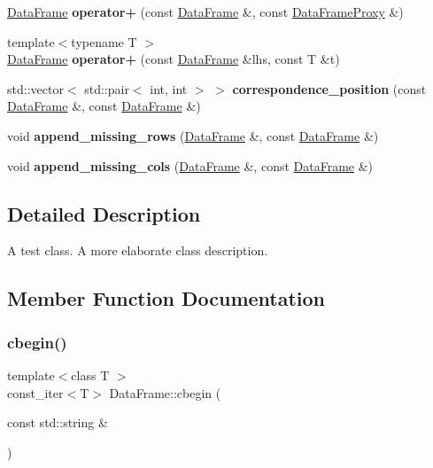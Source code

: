 \begin{DoxyCompactItemize}
\item 
\mbox{\label{classDataFrame_a32fc0676af70bd35bf83e11c9ab946fc}} 
\hyperlink{classDataFrame}{Data\+Frame} {\bfseries operator+} (const \hyperlink{classDataFrame}{Data\+Frame} \&, const \hyperlink{classDataFrame_1_1DataFrameProxy}{Data\+Frame\+Proxy} \&)
\item 
\mbox{\label{classDataFrame_af0bd28935e605ba646d407b02e0a5850}} 
{\footnotesize template$<$typename T $>$ }\\\hyperlink{classDataFrame}{Data\+Frame} {\bfseries operator+} (const \hyperlink{classDataFrame}{Data\+Frame} \&lhs, const T \&t)
\item 
\mbox{\label{classDataFrame_a425d7127fe7def6529cd4e6a6c1ec11f}} 
std\+::vector$<$ std\+::pair$<$ int, int $>$ $>$ {\bfseries correspondence\+\_\+position} (const \hyperlink{classDataFrame}{Data\+Frame} \&, const \hyperlink{classDataFrame}{Data\+Frame} \&)
\item 
\mbox{\label{classDataFrame_a221d3063f94569b545fe4c3ae56597e8}} 
void {\bfseries append\+\_\+missing\+\_\+rows} (\hyperlink{classDataFrame}{Data\+Frame} \&, const \hyperlink{classDataFrame}{Data\+Frame} \&)
\item 
\mbox{\label{classDataFrame_a27cc8acd51a5cd40e6a2726368914661}} 
void {\bfseries append\+\_\+missing\+\_\+cols} (\hyperlink{classDataFrame}{Data\+Frame} \&, const \hyperlink{classDataFrame}{Data\+Frame} \&)
\end{DoxyCompactItemize}


\subsection{Detailed Description}
A test class. A more elaborate class description. 

\subsection{Member Function Documentation}
\mbox{\label{classDataFrame_a857dadee258495743462244022a2dcce}} 
\subsubsection{\texorpdfstring{cbegin()}{cbegin()}}
{\footnotesize\ttfamily template$<$class T $>$ \\
const\+\_\+iter$<$T$>$ Data\+Frame\+::cbegin (\begin{DoxyParamCaption}\item[{const std\+::string \&}]{ }\end{DoxyParamCaption})}



